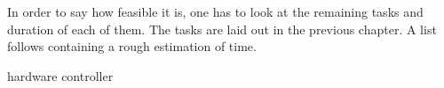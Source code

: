 In order to say how feasible it is, one has to look at the remaining tasks and duration of each of them. The tasks are laid out in the previous chapter. A list follows containing a rough estimation of time.

hardware
controller 